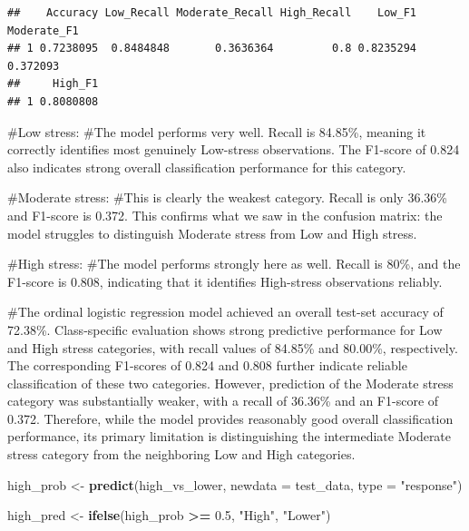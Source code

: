 \documentclass[
]{article}
\newenvironment{Shaded}{\begin{snugshade}}{\end{snugshade}}
\newcommand{\AttributeTok}[1]{\textcolor[rgb]{0.13,0.29,0.53}{#1}}
\newcommand{\FloatTok}[1]{\textcolor[rgb]{0.00,0.00,0.81}{#1}}
\newcommand{\FunctionTok}[1]{\textcolor[rgb]{0.13,0.29,0.53}{\textbf{#1}}}
\newcommand{\NormalTok}[1]{#1}
\newcommand{\OtherTok}[1]{\textcolor[rgb]{0.56,0.35,0.01}{#1}}
\newcommand{\SpecialCharTok}[1]{\textcolor[rgb]{0.81,0.36,0.00}{\textbf{#1}}}
\newcommand{\StringTok}[1]{\textcolor[rgb]{0.31,0.60,0.02}{#1}}
\begin{document}
\begin{verbatim}
##    Accuracy Low_Recall Moderate_Recall High_Recall    Low_F1 Moderate_F1
## 1 0.7238095  0.8484848       0.3636364         0.8 0.8235294    0.372093
##     High_F1
## 1 0.8080808
\end{verbatim}

\#Low stress: \#The model performs very well. Recall is 84.85\%, meaning
it correctly identifies most genuinely Low-stress observations. The
F1-score of 0.824 also indicates strong overall classification
performance for this category.

\#Moderate stress: \#This is clearly the weakest category. Recall is
only 36.36\% and F1-score is 0.372. This confirms what we saw in the
confusion matrix: the model struggles to distinguish Moderate stress
from Low and High stress.

\#High stress: \#The model performs strongly here as well. Recall is
80\%, and the F1-score is 0.808, indicating that it identifies
High-stress observations reliably.

\#The ordinal logistic regression model achieved an overall test-set
accuracy of 72.38\%. Class-specific evaluation shows strong predictive
performance for Low and High stress categories, with recall values of
84.85\% and 80.00\%, respectively. The corresponding F1-scores of 0.824
and 0.808 further indicate reliable classification of these two
categories. However, prediction of the Moderate stress category was
substantially weaker, with a recall of 36.36\% and an F1-score of 0.372.
Therefore, while the model provides reasonably good overall
classification performance, its primary limitation is distinguishing the
intermediate Moderate stress category from the neighboring Low and High
categories.

\begin{Shaded}
\begin{Highlighting}[]
\NormalTok{high\_prob }\OtherTok{\textless{}{-}} \FunctionTok{predict}\NormalTok{(high\_vs\_lower, }\AttributeTok{newdata =}\NormalTok{ test\_data, }\AttributeTok{type =} \StringTok{"response"}\NormalTok{)}
\end{Highlighting}
\end{Shaded}

\begin{Shaded}
\begin{Highlighting}[]
\NormalTok{high\_pred }\OtherTok{\textless{}{-}} \FunctionTok{ifelse}\NormalTok{(high\_prob }\SpecialCharTok{\textgreater{}=} \FloatTok{0.5}\NormalTok{, }\StringTok{"High"}\NormalTok{, }\StringTok{"Lower"}\NormalTok{)}
\end{Highlighting}
\end{Shaded}
\end{document}
